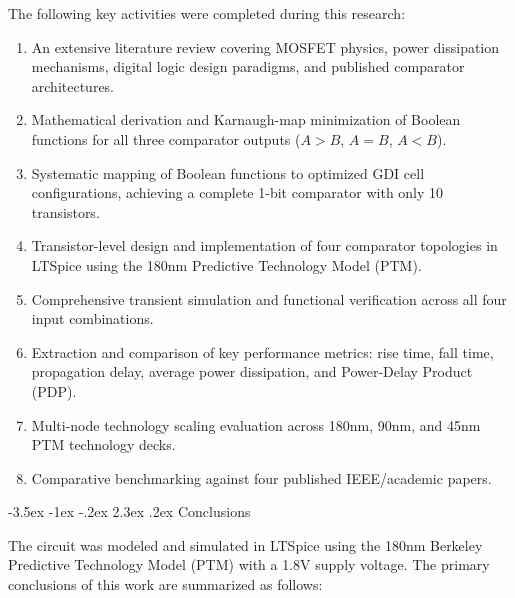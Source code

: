 \documentclass[12pt,a4paper,oneside]{report}
\makeatletter
\renewcommand\section{\@startsection {section}{1}{\z@}%
                                   {-3.5ex \@plus -1ex \@minus -.2ex}%
                                   {2.3ex \@plus.2ex}%
                                   {\normalfont\normalsize\bfseries}}
\makeatother
\begin{document}
The following key activities were completed during this research:
\begin{enumerate}
\item An extensive literature review covering MOSFET physics, power dissipation mechanisms, digital logic design paradigms, and published comparator architectures.
\item Mathematical derivation and Karnaugh-map minimization of Boolean functions for all three comparator outputs ($A>B$, $A=B$, $A<B$).
\item Systematic mapping of Boolean functions to optimized GDI cell configurations, achieving a complete 1-bit comparator with only 10 transistors.
\item Transistor-level design and implementation of four comparator topologies in LTSpice using the 180nm Predictive Technology Model (PTM).
\item Comprehensive transient simulation and functional verification across all four input combinations.
\item Extraction and comparison of key performance metrics: rise time, fall time, propagation delay, average power dissipation, and Power-Delay Product (PDP).
\item Multi-node technology scaling evaluation across 180nm, 90nm, and 45nm PTM technology decks.
\item Comparative benchmarking against four published IEEE/academic papers.
\end{enumerate}

\section{Conclusions}

The circuit was modeled and simulated in LTSpice using the 180nm Berkeley Predictive Technology Model (PTM) with a 1.8V supply voltage. The primary conclusions of this work are summarized as follows:
\end{document}
